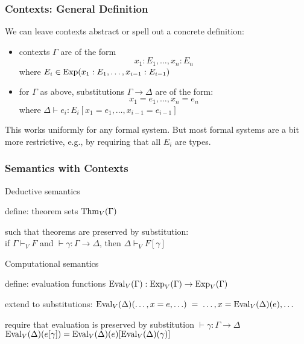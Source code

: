 \begin{frame}\frametitle{Contexts: General Definition}
We can leave contexts abstract or spell out a concrete definition:
\begin{itemize}
\item contexts $\Gamma$ are of the form \[x_1:E_1,\ldots,x_n:E_n\]
 where $E_i\in\mathrm{Exp}(x_1:E_1,\ldots,x_{i-1}:E_{i-1})$
\item for $\Gamma$ as above, substitutions $\Gamma\to \Delta$ are of the form: \[x_1=e_1,\ldots,x_n=e_n\]
 where $\Delta\vdash e_i: E_i[x_1=e_1,\ldots,x_{i-1}=e_{i-1}]$
\end{itemize}
\medskip

This works uniformly for any formal system.
But most formal systems are a bit more restrictive, e.g., by requiring that all $E_i$ are types.
\end{frame}

\begin{frame}\frametitle{Semantics with Contexts}
\begin{blockitems}{Deductive semantics}
\item define: theorem sets $\mathrm{Thm}_V(\Gamma)$
\item such that theorems are preserved by substitution: \\
 if $\Gamma\vdash_V F$ and $\vdash \gamma:\Gamma\to\Delta$, then $\Delta\vdash_V F[\gamma]$
\end{blockitems}

\begin{blockitems}{Computational semantics}
\item define: evaluation functions $\mathrm{Eval}_V(\Gamma):\mathrm{Exp}_V(\Gamma)\to\mathrm{Exp}_V(\Gamma)$
\item extend to substitutions: $\mathrm{Eval}_V(\Delta)(\ldots,x=e,\ldots)\;=\;\ldots,x=\mathrm{Eval}_V(\Delta)(e), \ldots$
\item require that evaluation is preserved by substitution $\vdash \gamma:\Gamma\to\Delta$ \\
  $\mathrm{Eval}_V(\Delta)(e[\gamma])=\mathrm{Eval}_V(\Delta)(e)[\mathrm{Eval}_V(\Delta)(\gamma)]$
\end{blockitems}
\end{frame}

